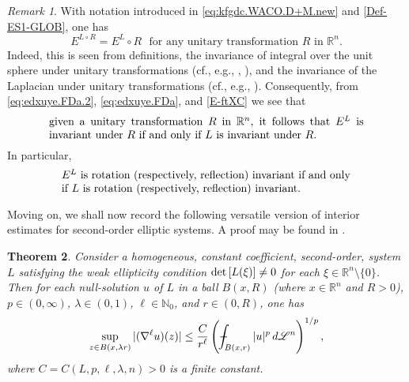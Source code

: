 \documentclass[11pt,reqno]{amsart}
\numberwithin{equation}{section}
\def\Xint#1{\mathchoice
   {\XXint\displaystyle\textstyle{#1}}%
   {\XXint\textstyle\scriptstyle{#1}}%
   {\XXint\scriptstyle\scriptscriptstyle{#1}}%
   {\XXint\scriptscriptstyle\scriptscriptstyle{#1}}%
   \!\int}
\def\XXint#1#2#3{{\setbox0=\hbox{$#1{#2#3}{\int}$}
     \vcenter{\hbox{$#2#3$}}\kern-.5\wd0}}
\def\aver#1{\Xint-_{#1}}
\newtheorem{theorem}{Theorem}[section]
\theoremstyle{remark}
\newtheorem{remark}[theorem]{Remark}
\begin{document}
\begin{remark}\label{tafh.R2}
With notation introduced in \eqref{eq:kfgdc.WACO.D+M.new} and \eqref{Def-ES1-GLOB}, one has
%
\begin{equation}\label{eq:edxuye.FDa.2}
E^{L\circ R}=E^L\circ R\,\,\text{ for any unitary transformation $R$ in ${\mathbb{R}}^n$}.
\end{equation}
%
Indeed, this is seen from definitions, the invariance of integral over the unit sphere under unitary transformations 
(cf., e.g., \cite{HoMiTa07}, \cite{GHA.II}), and the invariance of the Laplacian under unitary transformations 
(cf., e.g., \cite[Exercise~7.77, (7.14.3), p.\,319]{DMit18}). Consequently, from \eqref{eq:edxuye.FDa.2}, 
\eqref{eq:edxuye.FDa}, and \eqref{E-ftXC} we see that 
%
\begin{equation}\label{eq:edxuye.FDa.3}
\parbox{10.00cm}{given a unitary transformation $R$ in ${\mathbb{R}}^n$, it follows that $E^L$ is invariant under $R$ 
if and only if $L$ is invariant under $R$.}
\end{equation}
%
In particular, 
%
\begin{equation}\label{eq:edxuye.FDa.4}
\parbox{9.20cm}{$E^L$ is rotation (respectively, reflection) invariant  
if and only if $L$ is rotation (respectively, reflection) invariant.}
\end{equation}
\end{remark}

Moving on, we shall now record the following versatile version of interior estimates for
second-order elliptic systems. A proof may be found in \cite[Theorem~11.12, p.\,415]{DMit18}.

\begin{theorem}\label{ker-sbav}
Consider a homogeneous, constant coefficient, second-order, system $L$ satisfying the weak 
ellipticity condition ${\rm det}\,[L(\xi)]\not=0$ for each $\xi\in{\mathbb{R}}^n\setminus\{0\}$.
Then for each null-solution $u$ of $L$ in a ball $B(x,R)$ {\rm (}where $x\in{\mathbb{R}}^n$ and $R>0${\rm )}, 
$p\in(0,\infty)$, $\lambda\in(0,1)$, $\ell\in{\mathbb{N}}_0$, and $r\in(0,R)$, one has
%
\begin{equation}\label{detraz}
\sup_{z\in B(x,\lambda r)}|(\nabla^\ell u)(z)|
\leq\frac{C}{r^\ell}\left(\aver{B(x,r)}|u|^p\,d{\mathscr{L}}^n\right)^{1/p},
\end{equation}
%
where $C=C(L,p,\ell,\lambda,n)>0$ is a finite constant.
\end{theorem}
\end{document}
